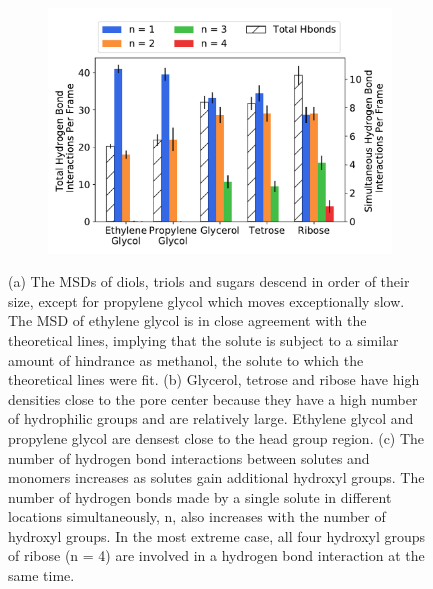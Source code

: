 \documentclass[journal=jpcbfk,manuscript=article]{achemso}
\begin{document}
\begin{figure}[!htb]
\begin{subfigure}{0.325\textwidth}
  \includegraphics[width=\linewidth]{multi_hbonds.pdf}
  \caption{}\label{fig:multi_hbonds}
  \end{subfigure}
  \caption{(a) The MSDs of diols, triols and sugars descend in order of their size, except
  for propylene glycol which moves exceptionally slow. The MSD of ethylene glycol 
  is in close agreement with the theoretical lines, implying that the solute 
  is subject to a similar amount of hindrance as methanol, the solute to which the
  theoretical lines were fit. (b) Glycerol, tetrose and ribose have high densities 
  close to the pore center because they have a high number of hydrophilic groups and
  are relatively large. Ethylene glycol and propylene glycol are densest close to the
  head group region. (c) The number of hydrogen bond interactions between solutes and
  monomers increases as solutes gain additional hydroxyl groups. The number of 
  hydrogen bonds made by a single solute in different locations simultaneously, n, 
  also increases with the number of hydroxyl groups. In the most extreme case, all 
  four hydroxyl groups of ribose (n = 4) are involved in a hydrogen bond interaction
  at the same time.}\label{fig:polyols}
  \end{figure}
  
\end{document}
